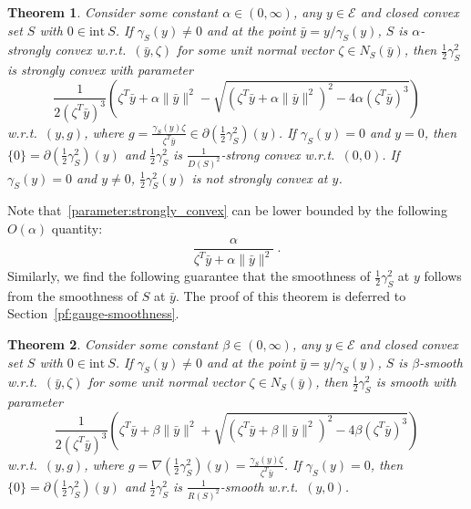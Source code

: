 \documentclass[sn-mathphys,Numbered]{sn-jnl}%
\newtheorem{theorem}{Theorem}%
\begin{document}
\begin{theorem} \label{thm:gauge-strong-convexity}
    Consider some constant $\alpha\in (0,\infty)$, any $y\in \mathcal{E}$ and closed convex set $S$ with $0\in \mathrm{int\ } S$. If $\gamma_S(y) \neq 0$ and at the point $\bar y = y/\gamma_S(y)$, $S$ is $\alpha$-strongly convex w.r.t.~$\left(\bar y, \zeta\right)$ for some unit normal vector $\zeta \in N_S(\bar y)$, then $\frac{1}{2}\gamma_S^2$ is strongly convex with parameter 
    \begin{equation}\label{parameter:strongly_convex}
    \frac{1}{2( \zeta^T \bar y)^3}\left( \zeta^T \bar y+\alpha\|\bar y\|^2-\sqrt{( \zeta ^T\bar y+\alpha\|\bar y\|^2)^2-4\alpha( \zeta^T \bar y)^3}\right) 
    \end{equation}
    w.r.t.~$(y, g)$, where $g =\frac{\gamma_S(y)\zeta}{\zeta^T\bar y} \in \partial (\frac{1}{2}\gamma_S^2)(y)$.
    If $\gamma_S(y)=0$ and $y = 0$, then $\{0\} = \partial (\frac{1}{2}\gamma_S^2)(y)$ and $\frac{1}{2}\gamma_S^2$ is $\frac{1}{D(S)^2}$-strong convex w.r.t.~$(0,0)$. If $\gamma_S(y)=0$ and $y \neq 0$, $\frac{1}{2}\gamma_S^2(y)$ is not strongly convex at $y$.
\end{theorem}
Note that~\eqref{parameter:strongly_convex} can be lower bounded by the following $O(\alpha)$ quantity:
\begin{equation} \label{eq:gauge-strong-convexity-bound}
    \frac{\alpha}{\zeta^T\bar y + \alpha \|\bar y\|^2} \ .
\end{equation}
Similarly, we find the following guarantee that the smoothness of $\frac{1}{2}\gamma_S^2$ at $y$ follows from the smoothness of $S$ at $\bar y$. The proof of this theorem is deferred to Section~\ref{pf:gauge-smoothness}.
\begin{theorem}\label{thm:gauge-smoothness}
    Consider some constant $\beta\in (0,\infty)$, any $y\in \mathcal{E}$ and closed convex set $S$ with $0\in \mathrm{int\ } S$. If $\gamma_S(y) \neq 0$ and at the point $\bar y = y/\gamma_S(y)$, $S$ is $\beta$-smooth w.r.t.~$\left(\bar y, \zeta\right)$ for some unit normal vector $\zeta \in N_S(\bar y)$, then $\frac{1}{2}\gamma_S^2$ is smooth with parameter 
    \begin{equation} \label{parameter:smooth}
    \frac{1}{2( \zeta^T \bar y)^3}\left( \zeta^T \bar y+\beta\|\bar y\|^2+\sqrt{( \zeta ^T\bar y+\beta\|\bar y\|^2)^2-4\beta( \zeta^T \bar y)^3}\right)
    \end{equation}
    w.r.t.~$(y, g)$, where $g  =\nabla (\frac{1}{2}\gamma_S^2)(y)=\frac{\gamma_S(y)\zeta}{\zeta^T\bar y}$. If $\gamma_S(y)=0$, then $\{0\} = \partial (\frac{1}{2}\gamma_S^2)(y)$ and $\frac{1}{2}\gamma_S^2$ is $\frac{1}{R(S)^2}$-smooth w.r.t.~$(y,0)$.
\end{theorem}
\end{document}

